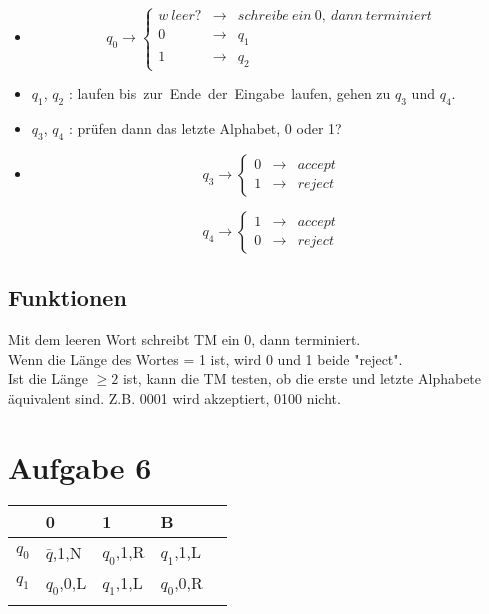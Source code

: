 \documentclass[a4paper,11pt]{scrartcl}
\begin{document}
		\begin{itemize}
			\item
			\begin{equation*}
				q_0\to\left\{
				\begin{aligned}
					w\ leer? & \to & schreibe\ ein\ 0,\ dann\ terminiert\\
					0 & \to & q_1 \\
					1 & \to & q_2 
				\end{aligned}
				\right.
			\end{equation*}
			\item $q_1$, $q_2$ : laufen bis\ zur\ Ende\ der\ Eingabe\ laufen, gehen zu $q_3$ und $q_4$.
			\item $q_3$, $q_4$ : prüfen dann das letzte Alphabet, 0 oder 1?
			\item

				\begin{equation*}
					q_3\to\left\{
					\begin{aligned}						
						0 & \to & accept \\
						1 & \to & reject 
					\end{aligned}
					\right.
				\end{equation*}
			
				\begin{equation*}
					q_4\to\left\{
					\begin{aligned}						
						1 & \to & accept \\
						0 & \to & reject
					\end{aligned}
					\right.
				\end{equation*}			
		\end{itemize}

	\subsection*{Funktionen}
		Mit dem leeren Wort schreibt TM ein 0, dann terminiert.\\
		Wenn die Länge des Wortes = 1 ist, wird 0 und 1 beide "reject".\\ 
		Ist die Länge $\ge 2$ ist, kann die TM testen, ob die erste und letzte Alphabete äquivalent sind. Z.B. 0001 wird akzeptiert, 0100 nicht.
		
	\section*{Aufgabe 6}
	
		\begin{table}[h!]
			\begin{tabular}{lllll}
				& 0                         & 1         & B         &  \\
				\hline
				$q_0$ & $\bar q$,1,N & $q_0$,1,R  & $q_1$,1,L  &  \\
				$q_1$ & $q_0$,0,L                 & $q_1$,1,L & $q_0$,0,R &  \\
				&                           &           &           & 
			\end{tabular}
		\end{table}
	
\end{document}
